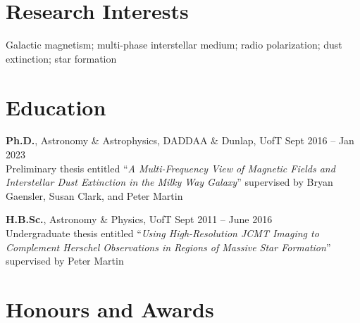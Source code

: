 \documentclass[10pt]{res} %
\begin{document}
\begin{resume}


\section{\Large Research Interests}
\vspace{-5pt} %
\noindent\makebox[\linewidth]{\rule{\textwidth}{0.4pt}}
\vspace{-20pt} %

Galactic magnetism; multi-phase interstellar medium; radio polarization; dust extinction; star formation


\section{\Large Education}
\vspace{-5pt} %
\noindent\makebox[\linewidth]{\rule{\textwidth}{0.4pt}}
\vspace{-20pt} %

{\bf Ph.D.}, Astronomy \& Astrophysics, DADDAA \& Dunlap, UofT \hfill Sept 2016 -- Jan 2023 \\
Preliminary thesis entitled ``\textit{A Multi-Frequency View of Magnetic Fields and Interstellar Dust Extinction in the Milky Way Galaxy}'' supervised by Bryan Gaensler, Susan Clark, and Peter Martin

{\bf H.B.Sc.}, Astronomy \& Physics, UofT \hfill Sept 2011 -- June 2016 \\ 
Undergraduate thesis entitled ``\textit{Using High-Resolution JCMT Imaging to Complement Herschel Observations in Regions of Massive Star Formation}'' supervised by Peter Martin
 

\section{\Large Honours and Awards}
\vspace{-5pt} %
\noindent\makebox[\linewidth]{\rule{\textwidth}{0.4pt}}
\vspace{-20pt} %


\end{resume}
\end{document}
